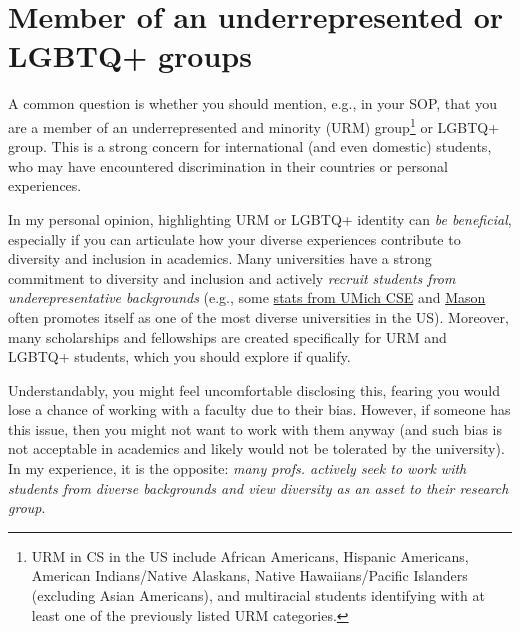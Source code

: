 \documentclass[oneside,11pt,dvipsnames]{book}
\def\sectioninfo#1{%
  \addcontentsline{toc}{sectioninfo}{%
    \noexpand\numberline{}\color{black}{#1}}%
}
\begin{document}
\section{Member of an underrepresented or LGBTQ+ groups}\label{sec:urm}
\sectioninfo{Being a minority can make you stand out and help your application.}

A common question is whether you should mention, e.g., in your SOP, that you are a member of an underrepresented and minority (URM) group\footnote{URM in CS in the US include African Americans, Hispanic Americans, American Indians/Native Alaskans, Native Hawaiians/Pacific Islanders (excluding Asian Americans), and multiracial students identifying with at least one of the previously listed URM categories.} or LGBTQ+ group.
This is a strong concern for international (and even domestic) students, who may have encountered discrimination in their countries or personal experiences.

In my personal opinion, highlighting URM or LGBTQ+ identity can \emph{be beneficial}, especially if you can articulate how your diverse experiences contribute to diversity and inclusion in academics.  Many universities have a strong commitment to diversity and inclusion and actively
\emph{recruit students from underepresentative backgrounds} (e.g., some \href{https://cse-climate.engin.umich.edu/reports/climate-dei-reports/cse-climate-and-dei-report-2022-2023/#grad-ethnicity}{stats from UMich CSE} and \href{https://www.Mason.edu/news/2022-09/mason-now-top-10-public-university-diversity-innovation-and-cybersecurity-education-us}{Mason} often promotes itself as one of the most diverse universities in the US). Moreover, many scholarships and fellowships are created specifically for URM and LGBTQ+ students, which you should explore if qualify.

Understandably, you might feel uncomfortable disclosing this, fearing you would lose a chance of working with a faculty due to their bias.  However, if someone has this issue, then you might not want to work with them anyway (and such bias is not acceptable in academics and likely would not be tolerated by the university). In my experience, it is the opposite: \emph{many profs. actively seek to work with students from diverse backgrounds and view diversity as an asset to their research group}.
\end{document}
